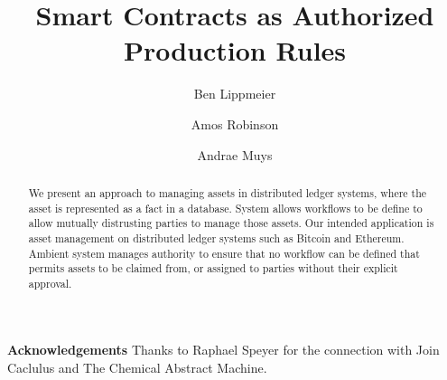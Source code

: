 \documentclass[format=sigconf, review=true, screen=true]{acmart}
\begin{document}

\title
{       Smart Contracts as Authorized Production Rules}



\author{Ben Lippmeier}

\author{Amos Robinson}

\author{Andrae Muys}

\begin{abstract}
We present an approach to managing assets in distributed ledger systems, where the asset is represented as a fact in a database. System allows workflows to be define to allow mutually distrusting parties to manage those assets. Our intended application is asset management on distributed ledger systems such as Bitcoin and Ethereum. Ambient system manages authority to ensure that no workflow can be defined that permits assets to be claimed from, or assigned to parties without their explicit approval.
\end{abstract}

\maketitle
\makeatactive










\textbf{Acknowledgements}
Thanks to Raphael Speyer for the connection with Join Caclulus and The Chemical Abstract Machine.

\clearpage{}


\end{document}
